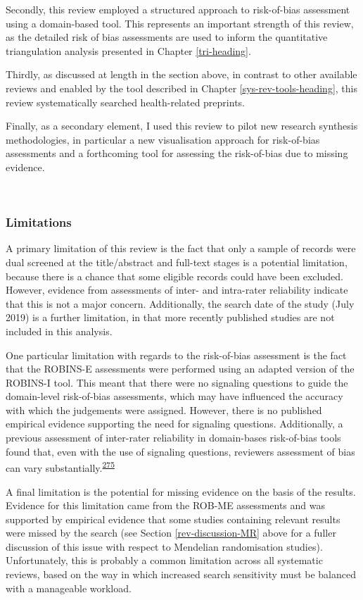 \documentclass[a4paper, twoside]{templates/ociamthesis}
\begin{document}
Secondly, this review employed a structured approach to risk-of-bias assessment using a domain-based tool. This represents an important strength of this review, as the detailed risk of bias assessments are used to inform the quantitative triangulation analysis presented in Chapter \ref{tri-heading}.

Thirdly, as discussed at length in the section above, in contrast to other available reviews and enabled by the tool described in Chapter \ref{sys-rev-tools-heading}, this review systematically searched health-related preprints.

Finally, as a secondary element, I used this review to pilot new research synthesis methodologies, in particular a new visualisation approach for risk-of-bias assessments and a forthcoming tool for assessing the risk-of-bias due to missing evidence.

~

\hypertarget{limitations}{%
\subsubsection{Limitations}\label{limitations}}

A primary limitation of this review is the fact that only a sample of records were dual screened at the title/abstract and full-text stages is a potential limitation, because there is a chance that some eligible records could have been excluded. However, evidence from assessments of inter- and intra-rater reliability indicate that this is not a major concern. Additionally, the search date of the study (July 2019) is a further limitation, in that more recently published studies are not included in this analysis.

One particular limitation with regards to the risk-of-bias assessment is the fact that the ROBINS-E assessments were performed using an adapted version of the ROBINS-I tool. This meant that there were no signaling questions to guide the domain-level risk-of-bias assessments, which may have influenced the accuracy with which the judgements were assigned. However, there is no published empirical evidence supporting the need for signaling questions. Additionally, a previous assessment of inter-rater reliability in domain-bases risk-of-bias tools found that, even with the use of signaling questions, reviewers assessment of bias can vary substantially.\textsuperscript{\protect\hyperlink{ref-jeyaraman2020}{275}}

A final limitation is the potential for missing evidence on the basis of the results. Evidence for this limitation came from the ROB-ME assessments and was supported by empirical evidence that some studies containing relevant results were missed by the search (see Section \ref{rev-discussion-MR} above for a fuller discussion of this issue with respect to Mendelian randomisation studies). Unfortunately, this is probably a common limitation across all systematic reviews, based on the way in which increased search sensitivity must be balanced with a manageable workload.
\end{document}
